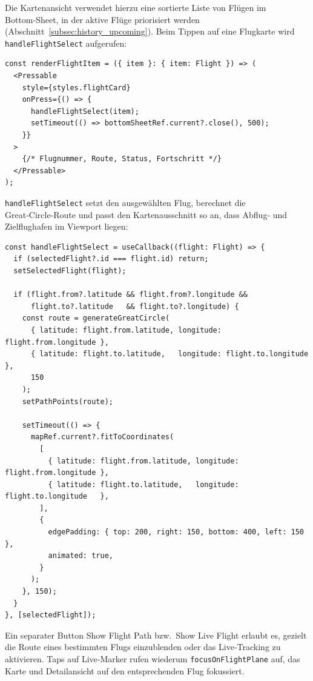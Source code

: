 Die Kartenansicht verwendet hierzu eine sortierte Liste von Flügen im Bottom‑Sheet, in der aktive Flüge priorisiert werden (Abschnitt~\ref{subsec:history_upcoming}).
Beim Tippen auf eine Flugkarte wird \texttt{handleFlightSelect} aufgerufen:

\begin{lstlisting}[style=skyline-ts,
  caption={Auswahl eines Flugs aus der Liste},
  label={lst:flight_select_list}]
const renderFlightItem = ({ item }: { item: Flight }) => (
  <Pressable
    style={styles.flightCard}
    onPress={() => {
      handleFlightSelect(item);
      setTimeout(() => bottomSheetRef.current?.close(), 500);
    }}
  >
    {/* Flugnummer, Route, Status, Fortschritt */}
  </Pressable>
);
\end{lstlisting}

\texttt{handleFlightSelect} setzt den ausgewählten Flug, berechnet die Great‑Circle‑Route und passt den Kartenausschnitt so an, dass Abflug‑ und Zielflughafen im Viewport liegen:

\begin{lstlisting}[style=skyline-ts,
  caption={Flugauswahl: Route berechnen und Karte fokussieren},
  label={lst:handle_flight_select}]
const handleFlightSelect = useCallback((flight: Flight) => {
  if (selectedFlight?.id === flight.id) return;
  setSelectedFlight(flight);

  if (flight.from?.latitude && flight.from?.longitude &&
      flight.to?.latitude   && flight.to?.longitude) {
    const route = generateGreatCircle(
      { latitude: flight.from.latitude, longitude: flight.from.longitude },
      { latitude: flight.to.latitude,   longitude: flight.to.longitude   },
      150
    );
    setPathPoints(route);

    setTimeout(() => {
      mapRef.current?.fitToCoordinates(
        [
          { latitude: flight.from.latitude, longitude: flight.from.longitude },
          { latitude: flight.to.latitude,   longitude: flight.to.longitude   },
        ],
        {
          edgePadding: { top: 200, right: 150, bottom: 400, left: 150 },
          animated: true,
        }
      );
    }, 150);
  }
}, [selectedFlight]);
\end{lstlisting}

Ein separater Button \glqq Show Flight Path\grqq{} bzw.\ \glqq Show Live Flight\grqq{} erlaubt es, gezielt die Route eines bestimmten Flugs einzublenden oder das Live‑Tracking zu aktivieren.
Taps auf Live‑Marker rufen wiederum \texttt{focusOnFlightPlane} auf, das Karte und Detailansicht auf den entsprechenden Flug fokussiert.

